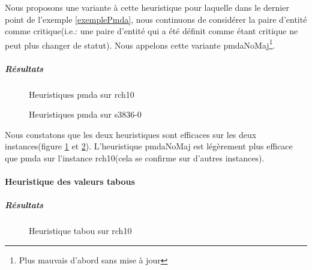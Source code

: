 Nous proposons une variante à cette heuristique pour laquelle dans le dernier point de l'exemple \ref{exemplePmda}, nous continuons de considérer la paire d'entité comme critique(i.e.: une paire d'entité qui a été définit comme étant critique ne peut plus changer de statut). Nous appelons cette variante pmdaNoMaj\footnote{Plus mauvais d'abord sans mise à jour}.

\subparagraph{Résultats}
\begin{figure}
\centering
	\begin{minipage}[c]{0.49\linewidth}
	\centering
	
	\end{minipage}
	\begin{minipage}[c]{0.49\linewidth}
	\centering
	
	\end{minipage}
\caption{Heuristiques pmda sur rch10}
\label{pmdaRch10}
\end{figure}

\begin{figure}
\centering
	\begin{minipage}[c]{0.49\linewidth}
	\centering
	
	\end{minipage}
	\begin{minipage}[c]{0.49\linewidth}
	\centering
	
	\end{minipage}
\caption{Heuristiques pmda sur s3836-0}
\label{pmdaS3836}
\end{figure}

Nous constatons que les deux heuristiques sont efficaces sur les deux instances(figure \ref{pmdaRch10} et \ref{pmdaS3836}). L'heuristique pmdaNoMaj est légèrement plus efficace que pmda sur l'instance rch10(cela se confirme sur d'autres instances).
\paragraph{Heuristique des valeurs tabous}
\subparagraph{Résultats}

\begin{figure}[H]
\centering
	\begin{minipage}[c]{0.49\linewidth}
	\centering
	
	\end{minipage}
	\begin{minipage}[c]{0.49\linewidth}
	\centering
	
	\end{minipage}
\caption{Heuristique tabou sur rch10}
\end{figure}

